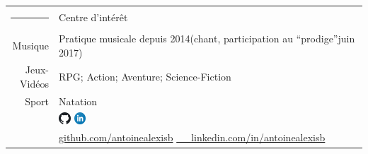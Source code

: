 \documentclass[a4paper, 11pt, oneside]{article}
\begin{document}
\noindent\begin{tabular}{rp{15cm}}
  \textcolor{maCouleur}{\rule{2cm}{0.2cm}}&\textcolor{maCouleur}{Centre d'intérêt}\\
  Musique & {Pratique musicale depuis 2014(chant, participation au “prodige”juin 2017)}\\
  Jeux-Vidéos & {RPG; Action; Aventure; Science-Fiction}\\
  Sport & {Natation}\\[6mm]

  & \hspace*{1.0cm}\href{http://github.com/antoinealexisb}
         {\includegraphics[width=0.04\textwidth]{git}} \hspace*{2.8cm} \href{http://www.linkedin.com/in/antoinealexisb}{\includegraphics[width=0.04\textwidth]{linke}}\\
  & \href{http://github.com/antoinealexisb}{\tiny github.com/antoinealexisb} \href{http://www.linkedin.com/in/antoinealexisb}{\tiny \ \ \ linkedin.com/in/antoinealexisb}
  \end{tabular}

\end{document}

